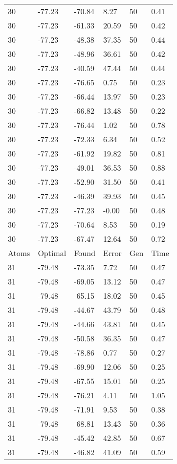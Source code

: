 \documentclass{report}
\begin{document}
\begin{appendix}
\begin{longtable}{llllll}
30 & -77.23 & -70.84 & 8.27 & 50 & 0.41 \\
30 & -77.23 & -61.33 & 20.59 & 50 & 0.42 \\
30 & -77.23 & -48.38 & 37.35 & 50 & 0.44 \\
30 & -77.23 & -48.96 & 36.61 & 50 & 0.42 \\
30 & -77.23 & -40.59 & 47.44 & 50 & 0.44 \\
30 & -77.23 & -76.65 & 0.75 & 50 & 0.23 \\
30 & -77.23 & -66.44 & 13.97 & 50 & 0.23 \\
30 & -77.23 & -66.82 & 13.48 & 50 & 0.22 \\
30 & -77.23 & -76.44 & 1.02 & 50 & 0.78 \\
30 & -77.23 & -72.33 & 6.34 & 50 & 0.52 \\
30 & -77.23 & -61.92 & 19.82 & 50 & 0.81 \\
30 & -77.23 & -49.01 & 36.53 & 50 & 0.88 \\
30 & -77.23 & -52.90 & 31.50 & 50 & 0.41 \\
30 & -77.23 & -46.39 & 39.93 & 50 & 0.45 \\
30 & -77.23 & -77.23 & -0.00 & 50 & 0.48 \\
30 & -77.23 & -70.64 & 8.53 & 50 & 0.19 \\
30 & -77.23 & -67.47 & 12.64 & 50 & 0.72 \\
Atoms & Optimal & Found & Error & Gen & Time \\
31 & -79.48 & -73.35 & 7.72 & 50 & 0.47 \\
31 & -79.48 & -69.05 & 13.12 & 50 & 0.47 \\
31 & -79.48 & -65.15 & 18.02 & 50 & 0.45 \\
31 & -79.48 & -44.67 & 43.79 & 50 & 0.48 \\
31 & -79.48 & -44.66 & 43.81 & 50 & 0.45 \\
31 & -79.48 & -50.58 & 36.35 & 50 & 0.47 \\
31 & -79.48 & -78.86 & 0.77 & 50 & 0.27 \\
31 & -79.48 & -69.90 & 12.06 & 50 & 0.25 \\
31 & -79.48 & -67.55 & 15.01 & 50 & 0.25 \\
31 & -79.48 & -76.21 & 4.11 & 50 & 1.05 \\
31 & -79.48 & -71.91 & 9.53 & 50 & 0.38 \\
31 & -79.48 & -68.81 & 13.43 & 50 & 0.36 \\
31 & -79.48 & -45.42 & 42.85 & 50 & 0.67 \\
31 & -79.48 & -46.82 & 41.09 & 50 & 0.59 \\

\end{longtable}
\end{appendix}
\end{document}
